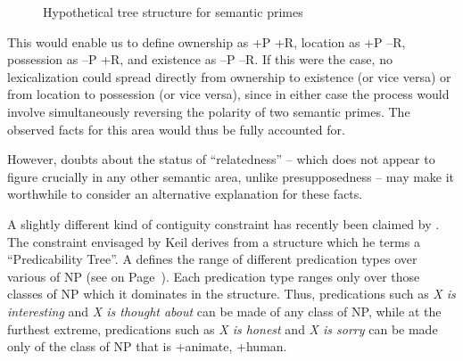 
\begin{figure}
	\begin{center}
		
		
		\caption{Hypothetical tree structure for semantic primes}\label{fig:4.6}
	\end{center}
\end{figure}

This would enable us to define ownership as +P +R, location as +P --R, possession as --P +R, and existence as --P --R. If this were the case, no lexicalization could spread directly from ownership to existence (or vice versa) or from location to possession (or vice versa), since in either case the process would involve simultaneously reversing the polarity of two semantic primes. The observed facts for this area would thus be fully accounted for.

However, doubts about the status of ``relatedness'' -- which does not appear to figure crucially in any other semantic area, unlike presupposedness -- may make it worthwhile to consider an alternative explanation for these facts.

A slightly different kind of contiguity constraint has recently been claimed by \citet{Keil1979,Keil1981}. The constraint envisaged by Keil derives from a structure which he terms a ``Predicability Tree''. A  defines the range of different predication types over various  of NP (see  on Page~\pageref{fig:4.7}). Each predication type ranges only over those classes of NP which it dominates in the structure. Thus, predications such as \textit{X is interesting} and \textit{X is thought about} can be made of any class of NP, while at the
furthest extreme, predications such as \textit{X is honest} and \textit{X is sorry} can be made only of the class of NP that is +animate, +human.

